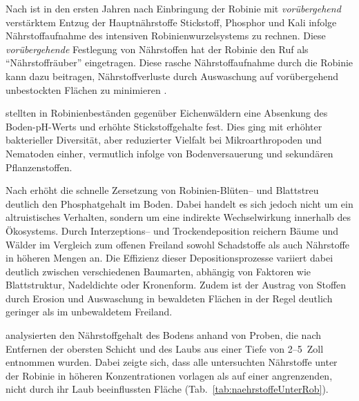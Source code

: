 \documentclass[twocolumn]{scrartcl}
\begin{document}
Nach \citet{mueller1991robinie} ist in den ersten Jahren nach Einbringung der Robinie mit \emph{vorübergehend} verstärktem Entzug der Hauptnährstoffe Stickstoff, Phosphor und Kali infolge Nährstoffaufnahme des intensiven Robinienwurzelsystems zu rechnen. Diese \emph{vorübergehende} Festlegung von Nährstoffen hat der Robinie den Ruf als \enquote{Nährstoffräuber} eingetragen.
Diese rasche Nährstoffaufnahme durch die Robinie kann dazu beitragen, Nährstoffverluste durch Auswaschung auf vorübergehend unbestockten Flächen zu minimieren \citep{boring1984robinie}.

\citet{lazzaro2018robinie} stellten in Robinienbeständen gegenüber Eichenwäldern eine Absenkung des Boden-pH-Werts und erhöhte Stickstoffgehalte fest. Dies ging mit erhöhter bakterieller Diversität, aber reduzierter Vielfalt bei Mikroarthropoden und Nematoden einher, vermutlich infolge von Bodenversauerung und sekundären Pflanzenstoffen.

Nach \citet{lee2010robinie} erhöht die schnelle Zersetzung von Robinien-Blüten-- und Blattstreu deutlich den Phosphatgehalt im Boden. Dabei handelt es sich jedoch nicht um ein altruistisches Verhalten, sondern um eine indirekte Wechselwirkung innerhalb des Ökosystems. Durch Interzeptions-- und Trockendeposition reichern Bäume und Wälder im Vergleich zum offenen Freiland sowohl Schadstoffe als auch Nährstoffe in höheren Mengen an. Die Effizienz dieser Depositionsprozesse variiert dabei deutlich zwischen verschiedenen Baumarten, abhängig von Faktoren wie Blattstruktur, Nadeldichte oder Kronenform. Zudem ist der Austrag von Stoffen durch Erosion und Auswaschung in bewaldeten Flächen in der Regel deutlich geringer als im unbewaldetem Freiland.

\citet{garman1938robinie} analysierten den Nährstoffgehalt des Bodens anhand von Proben, die nach Entfernen der obersten Schicht und des Laubs aus einer Tiefe von 2--5~Zoll entnommen wurden. Dabei zeigte sich, dass alle untersuchten Nährstoffe unter der Robinie in höheren Konzentrationen vorlagen als auf einer angrenzenden, nicht durch ihr Laub beeinflussten Fläche (Tab.~\ref{tab:naehrstoffeUnterRob}).
\end{document}
